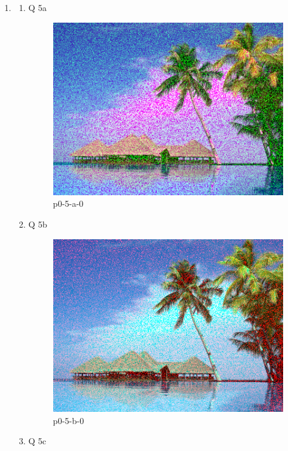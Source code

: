 \documentclass[12pt,a4paper]{article}
\begin{document}
\begin{enumerate}
\item
\begin{enumerate}
\item Q 5a

\begin{figure}[ht]
\centering
\includegraphics{output/p0-5-a-0}
\caption{p0-5-a-0}
\label{fig:p0-5-a-0}
\end{figure}

\item Q 5b

\begin{figure}[ht]
\centering
\includegraphics{output/p0-5-b-0}
\caption{p0-5-b-0}
\label{fig:p0-5-b-0}
\end{figure}

\item Q 5c
\end{enumerate}

\end{enumerate}
\end{document}
